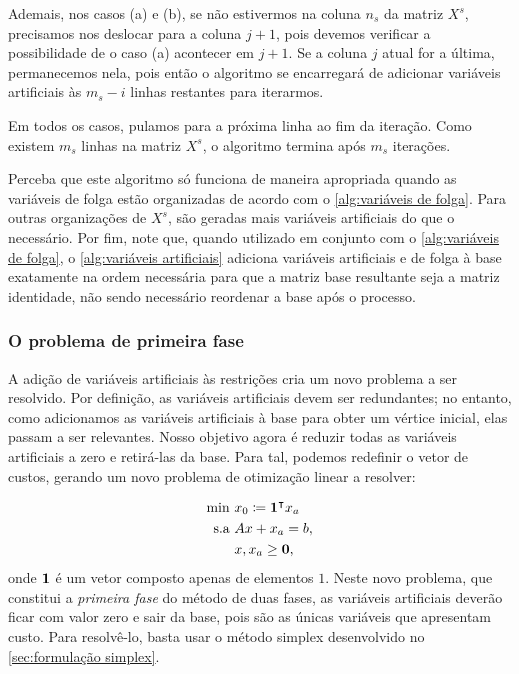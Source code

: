 Ademais, nos casos (a) e (b), se não estivermos na coluna $n_s$ da matriz $ X^s$, precisamos nos deslocar para a coluna $j + 1$, pois devemos verificar a possibilidade de o caso (a) acontecer em $j + 1$. Se a coluna $j$ atual for a última, permanecemos nela, pois então o algoritmo se encarregará de adicionar variáveis artificiais às $m_s - i$ linhas restantes para iterarmos.

Em todos os casos, pulamos para a próxima linha ao fim da iteração. Como existem $m_s$ linhas na matriz $ X^s$, o algoritmo termina após $m_s$ iterações.

Perceba que este algoritmo só funciona de maneira apropriada quando as variáveis de folga estão organizadas de acordo com o \cref{alg:variáveis de folga}. Para outras organizações de $ X^s$, são geradas mais variáveis artificiais do que o necessário. Por fim, note que, quando utilizado em conjunto com o \cref{alg:variáveis de folga}, o \cref{alg:variáveis artificiais} adiciona variáveis artificiais e de folga à base exatamente na ordem necessária para que a matriz base resultante seja a matriz identidade, não sendo necessário reordenar a base após o processo.

\subsubsection{O problema de primeira fase}
A adição de variáveis artificiais às restrições cria um novo problema a ser resolvido. Por definição, as variáveis artificiais devem ser redundantes; no entanto, como adicionamos as variáveis artificiais à base para obter um vértice inicial, elas passam a ser relevantes. Nosso objetivo agora é reduzir todas as variáveis artificiais a zero e retirá-las da base. Para tal, podemos redefinir o vetor de custos, gerando um novo problema de otimização linear a resolver:

\begin{align}
    \min\ & x_0 \coloneqq \vb{1}^\intercal x_{a}\\
    \textrm{s.a }& A x + x_{a} = b,\\
    &  x, x_{a} \geq \vb 0,
\end{align}
onde $\vb{1}$ é um vetor composto apenas de elementos $1$. Neste novo problema, que constitui a \emph{primeira fase} do método de duas fases, as variáveis artificiais deverão ficar com valor zero e sair da base, pois são as únicas variáveis que apresentam custo. Para resolvê-lo, basta usar o método simplex desenvolvido no \cref{sec:formulação simplex}.


